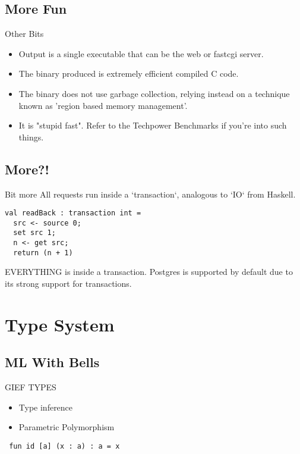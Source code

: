 \documentclass{beamer}
\begin{document}
\subsection{More Fun}
\begin{frame}[fragile]{Other Bits}

\begin{itemize}
\item Output is a single executable that can be the web or fastcgi server.
\item The binary produced is extremely efficient compiled C code.
\item The binary does not use garbage collection, relying instead on a technique known as 'region based memory management'.
\item It is "stupid fast". Refer to the Techpower Benchmarks if you're into such things.
\end{itemize}
\end{frame}

\subsection{More?!}
\begin{frame}[fragile]{Bit more}
All requests run inside a `transaction`, analogous to `IO` from Haskell.
\begin{verbatim}
val readBack : transaction int =
  src <- source 0;
  set src 1;
  n <- get src;
  return (n + 1)
\end{verbatim}
EVERYTHING is inside a transaction. Postgres is supported by default due to its strong support for transactions.
\end{frame}

\section{Type System}
\subsection{ML With Bells}
\begin{frame}[fragile]{GIEF TYPES}
\begin{itemize}
\item Type inference
\item Parametric Polymorphism
\end{itemize}
\begin{verbatim} fun id [a] (x : a) : a = x \end{verbatim}
\end{frame}
\end{document}
